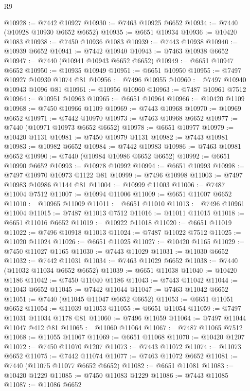 \begin{lexlean}{R9}
\begin{coremodule}
@10928 := @7442 @10927
@10930 := @7463 @10925 @6652
@10934 := @7440 (@10928 @10930 @6652 @6652)
@10935 := @6651 @10934
@10936 := @10420 @1083
@10938 := @7450 @10936 @1083
@10939 := @7443 @10938
@10940 := @10939 @6652
@10941 := @7442 @10940
@10943 := @7463 @10938 @6652
@10947 := @7440 (@10941 @10943 @6652 @6652)
@10949 := @6651 @10947 @6652
@10950 := @10935 @10949
@10951 := @6651 @10950
@10955 := @7497 @10927 @10930 @1074 @81
@10956 := @7496 @10955
@10960 := @7497 @10940 @10943 @1096 @81
@10961 := @10956 @10960
@10963 := @7487 @10961 @7512
@10964 := @10951 @10963
@10965 := @6651 @10964
@10966 := @10420 @1109
@10968 := @7450 @10966 @1109
@10969 := @7443 @10968
@10970 := @10969 @6652
@10971 := @7442 @10970
@10973 := @7463 @10968 @6652
@10977 := @7440 (@10971 @10973 @6652 @6652)
@10978 := @6651 @10977
@10979 := @10420 @1131
@10981 := @7450 @10979 @1131
@10982 := @7443 @10981
@10983 := @10982 @6652
@10984 := @7442 @10983
@10986 := @7463 @10981 @6652
@10990 := @7440 (@10984 @10986 @6652 @6652)
@10992 := @6651 @10990 @6652
@10993 := @10978 @10992
@10994 := @6651 @10993
@10998 := @7497 @10970 @10973 @1122 @81
@10999 := @7496 @10998
@11003 := @7497 @10983 @10986 @1144 @81
@11004 := @10999 @11003
@11006 := @7487 @11004 @7512
@11007 := @10994 @11006
@11009 := @6651 @11007 @6652
@11010 := @10965 @11009
@11011 := @6651 @11010
@11013 := @7496 @10961 @11004
@11015 := @7487 @11013 @7512
@11016 := @11011 @11015
@11018 := @6651 @11016 @6652
@11019 := @10922 @11018
@11020 := @6651 @11019
@11022 := @7496 @10918 @11013
@11024 := @7487 @11022 @7512
@11025 := @11020 @11024
@11026 := @6651 @11025
@11027 := @10420 @1165
@11029 := @7450 @11027 @1165
@11030 := @7443 @11029
@11031 := @11030 @6652
@11032 := @7442 @11031
@11034 := @7463 @11029 @6652
@11038 := @7440 (@11032 @11034 @6652 @6652)
@11039 := @6651 @11038
@11040 := @10420 @1186
@11042 := @7450 @11040 @1186
@11043 := @7443 @11042
@11044 := @11043 @6652
@11045 := @7442 @11044
@11047 := @7463 @11042 @6652
@11051 := @7440 (@11045 @11047 @6652 @6652)
@11053 := @6651 @11051 @6652
@11054 := @11039 @11053
@11055 := @6651 @11054
@11059 := @7497 @11031 @11034 @1178 @81
@11060 := @7496 @11059
@11064 := @7497 @11044 @11047 @412 @81
@11065 := @11060 @11064
@11067 := @7487 @11065 @7512
@11068 := @11055 @11067
@11069 := @6651 @11068
@11070 := @10420 @1207
@11072 := @7450 @11070 @1207
@11073 := @7443 @11072
@11074 := @11073 @6652
@11075 := @7442 @11074
@11077 := @7463 @11072 @6652
@11081 := @7440 (@11075 @11077 @6652 @6652)
@11082 := @6651 @11081
@11083 := @10420 @1229
@11085 := @7450 @11083 @1229
@11086 := @7443 @11085
@11087 := @11086 @6652

\end{coremodule}
\end{lexlean}
